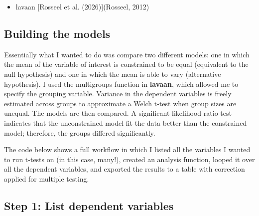 \documentclass[
  letterpaper,
  DIV=11,
  numbers=noendperiod]{scrreprt}
\providecommand{\tightlist}{%
  \setlength{\itemsep}{0pt}\setlength{\parskip}{0pt}}\usepackage{longtable,booktabs,array}
\begin{document}
\begin{itemize}
\tightlist
\item
  lavaan {[}Rosseel et al. (2026){]}(Rosseel, 2012)
\end{itemize}

\subsection{Building the models}\label{building-the-models}

Essentially what I wanted to do was compare two different models: one in
which the mean of the variable of interest is constrained to be equal
(equivalent to the null hypothesis) and one in which the mean is able to
vary (alternative hypothesis). I used the multigroups function in
\textbf{lavaan}, which allowed me to specify the grouping variable.
Variance in the dependent variables is freely estimated across groups to
approximate a Welch t-test when group sizes are unequal. The models are
then compared. A significant likelihood ratio test indicates that the
unconstrained model fit the data better than the constrained model;
therefore, the groups differed significantly.

The code below shows a full workflow in which I listed all the variables
I wanted to run t-tests on (in this case, many!), created an analysis
function, looped it over all the dependent variables, and exported the
results to a table with correction applied for multiple testing.

\subsection{Step 1: List dependent
variables}\label{step-1-list-dependent-variables}
\end{document}
